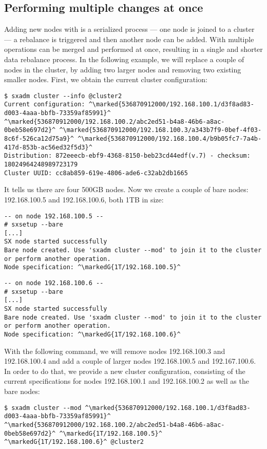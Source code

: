 \subsection{Performing multiple changes at once}
Adding new nodes with  is a serialized process --- one node is
joined to a cluster --- a rebalance is triggered and then another node can be
added. With  multiple operations can be merged
and performed at once, resulting in a single and shorter data rebalance
process. In the following example, we will replace a couple of nodes in the
cluster, by adding two larger nodes and removing two existing smaller nodes.
First, we obtain the current cluster configuration:
\begin{lstlisting}
$ sxadm cluster --info @cluster2
Current configuration: ^\marked{536870912000/192.168.100.1/d3f8ad83-d003-4aaa-bbfb-73359af85991}^ ^\marked{536870912000/192.168.100.2/abc2ed51-b4a8-46b6-a8ac-0beb58e697d2}^ ^\marked{536870912000/192.168.100.3/a343b7f9-0bef-4f03-8c6f-526ca12d75a9}^ ^\marked{536870912000/192.168.100.4/b9b05fc7-7a4b-417d-853b-ac56ed32f5d3}^
Distribution: 872eeecb-ebf9-4368-8150-beb23cd44edf(v.7) - checksum: 18024964248989723179
Cluster UUID: cc8ab859-619e-4806-ade6-c32ab2db1665
\end{lstlisting}
It tells us there are four 500GB nodes. Now we create a couple of bare nodes: 192.168.100.5
and 192.168.100.6, both 1TB in size:
\begin{lstlisting}
-- on node 192.168.100.5 --
# sxsetup --bare
[...]
SX node started successfully
Bare node created. Use 'sxadm cluster --mod' to join it to the cluster
or perform another operation.
Node specification: ^\markedG{1T/192.168.100.5}^
\end{lstlisting}
\begin{lstlisting}
-- on node 192.168.100.6 --
# sxsetup --bare
[...]
SX node started successfully
Bare node created. Use 'sxadm cluster --mod' to join it to the cluster
or perform another operation.
Node specification: ^\markedG{1T/192.168.100.6}^
\end{lstlisting}
With the following command, we will remove nodes 192.168.100.3 and
192.168.100.4 and add a couple of larger nodes 192.168.100.5 and
192.167.100.6. In order to do that, we provide a new cluster configuration,
consisting of the current specifications for nodes 192.168.100.1 and
192.168.100.2 as well as the bare nodes:
\begin{lstlisting}
$ sxadm cluster --mod ^\marked{536870912000/192.168.100.1/d3f8ad83-d003-4aaa-bbfb-73359af85991}^ ^\marked{536870912000/192.168.100.2/abc2ed51-b4a8-46b6-a8ac-0beb58e697d2}^ ^\markedG{1T/192.168.100.5}^ ^\markedG{1T/192.168.100.6}^ @cluster2
\end{lstlisting}
